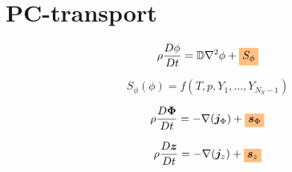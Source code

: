 \documentclass[20pt,twocolumn]{article}
\newcommand{\highlight}[1]{%
  \colorbox{orange!50}{$\displaystyle#1$}}
\begin{document}

\vspace{10mm}

\setlength{\parindent}{0cm}

\LARGE

\section{PC-transport}

\begin{equation*}
\rho \frac{D \phi}{Dt} = \mathbb{D} \nabla^2 \phi + \highlight{S_{\phi}}
\end{equation*}

\begin{equation*}
S_{\phi}(\phi) = f(T, p, Y_1, \dots, Y_{N_S - 1})
\end{equation*}

\begin{equation*}
\rho \frac{D \bm{\Phi}}{Dt} = - \nabla (\bm{j}_{\Phi}) + \highlight{\bm{s}_{\Phi}}
\end{equation*}

\begin{equation*}
\rho \frac{D \bm{z}}{Dt} = - \nabla (\bm{j}_{z}) + \highlight{\bm{s}_{z}}
\end{equation*}
\end{document}

